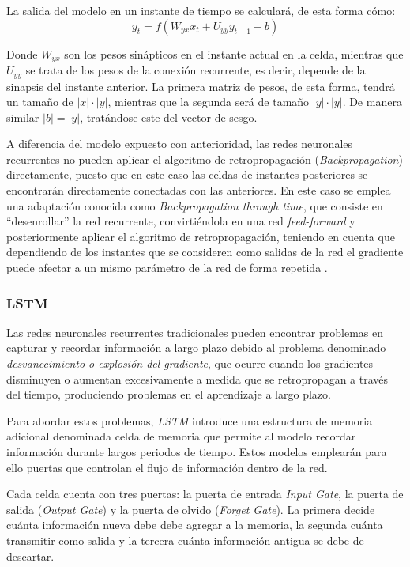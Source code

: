 
La salida del modelo en un instante de tiempo se calculará, de esta forma cómo:
\begin{equation}
    y_t = f(W_{yx}x_t + U_{yy} y_{t-1} + b) 
\end{equation}

Donde \(W_{yx}\) son los pesos sinápticos en el instante actual en la celda, mientras que \(U_{yy}\) se
trata de los pesos de la conexión recurrente, es decir, depende de la sinapsis del instante anterior.
La primera matriz de pesos, de esta forma, tendrá un tamaño de \(|x| \cdot |y|\), mientras que la segunda
será de tamaño \(|y| \cdot  |y|\). De manera similar \(|b| = |y|\), tratándose este del vector de sesgo.

A diferencia del modelo expuesto con anterioridad, las redes neuronales recurrentes no pueden aplicar el algoritmo de retropropagación (\textit{Backpropagation})
directamente, puesto que en este caso las celdas de instantes posteriores se encontrarán directamente conectadas con las anteriores.
En este caso se emplea una adaptación conocida como \textit{Backpropagation through time}, que consiste en ``desenrollar'' la red recurrente, convirtiéndola
en una red \textit{feed-forward} y posteriormente aplicar el algoritmo de retropropagación, teniendo en cuenta que dependiendo de los instantes 
que se consideren como salidas de la red el gradiente puede afectar a un mismo parámetro de la red de forma repetida \cite{book:rue2019}.

\subsubsection{LSTM}
Las redes neuronales recurrentes tradicionales pueden encontrar problemas en capturar y recordar información
a largo plazo debido al problema denominado \textit{desvanecimiento o explosión del gradiente}, que ocurre
cuando los gradientes disminuyen o aumentan excesivamente a medida que se retropropagan a través
del tiempo, produciendo problemas en el aprendizaje a largo plazo.

Para abordar estos problemas, \textit{LSTM} introduce una estructura de memoria adicional denominada
celda de memoria que permite al modelo recordar información durante largos periodos de tiempo. Estos 
modelos emplearán para ello puertas que controlan el flujo de información dentro de la red.

Cada celda cuenta con tres puertas: la puerta de entrada \textit{Input Gate}, la puerta de salida 
(\textit{Output Gate}) y la puerta de olvido (\textit{Forget Gate}). La primera decide
cuánta información nueva debe debe agregar a la memoria, la segunda cuánta transmitir como salida y 
la tercera cuánta información antigua se debe de descartar.

